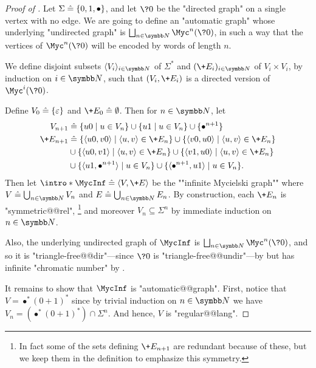 \begin{proof}[Proof of ]
  Let $\Sigma \mathrel{\hat{=}} \{0,1,\bullet\}$, and let $\?0$ be the "directed
  graph" on a single vertex with no edge.
  We are going to define an "automatic graph" whose underlying "undirected graph"
  is $\bigdcup_{n\in\N} \Myc^n(\?0)$, in such a way that the vertices of $\Myc^n(\?0)$
  will be encoded by words of length $n$.

  We define
  disjoint subsets $\tup{V_i}_{i\in\N}$ of $\Sigma^*$
  and $(\+E_i)_{i\in\N}$ of $V_i \times V_i$, by induction on $i\in\N$,
  such that $(V_i, \+E_i)$ is a directed version of $\Myc^i(\?0)$.

  Define $V_0 \mathrel{\hat{=}} \{\varepsilon\}$ and $\+E_0 \defeq \emptyset$.
  Then for $n \in \N$, let
  \begin{align*}
    V_{n+1} & \defeq \{u0\mid u \in V_n\}\cup \{u1\mid u \in V_n\}\cup\{\bullet^{n+1}\}\\
    \+E_{n+1} & \defeq \{\langle u0,v0\rangle \mid \langle u,v\rangle \in \+E_n\}
		\cup \{\langle v0,u0\rangle \mid \langle u,v\rangle \in \+E_n\} \\
		& \cup \{\langle u0,v1\rangle \mid \langle u,v\rangle \in \+E_n\}
		\cup \{\langle v1,u0\rangle \mid \langle u,v\rangle \in \+E_n\} \\
    	& \cup \{\langle u1, \bullet^{n+1}\rangle \mid u\in V_n\}
		\cup \{\langle \bullet^{n+1}, u1\rangle \mid u\in V_n\}.
  \end{align*}
  Then let \AP$\intro*\MycInf \defeq \tup{V, \+E}$ be
  the ""infinite Mycielski graph"" where $V \defeq \bigcup_{n\in \N} V_n$
  and $E \defeq \bigcup_{n\in \N} E_n$.
  By construction, each $\+E_n$ is "symmetric@@rel",%
  \footnote{In fact some of the sets defining $\+E_{n+1}$ are redundant because of these,
  but we keep them in the definition to emphasize this symmetry.}
  and moreover $V_n \subseteq \Sigma^n$ by immediate induction on $n\in\N$.

  Also, the underlying undirected graph of $\MycInf$ is
  $\bigdcup_{n\in\N} \Myc^n(\?0)$, and so it is "triangle-free@@dir"---since $\?0$ is "triangle-free@@undir"---by  but has infinite
  "chromatic number" by . 
  
  It remains to show that $\MycInf$ is "automatic@@graph".
  First, notice that $V = \bullet^*(0+1)^*$ since by trivial induction
  on $n\in\N$ we have $V_n = (\bullet^*(0+1)^*)\cap \Sigma^n$. And hence,
  $V$ is "regular@@lang".


\end{proof}
